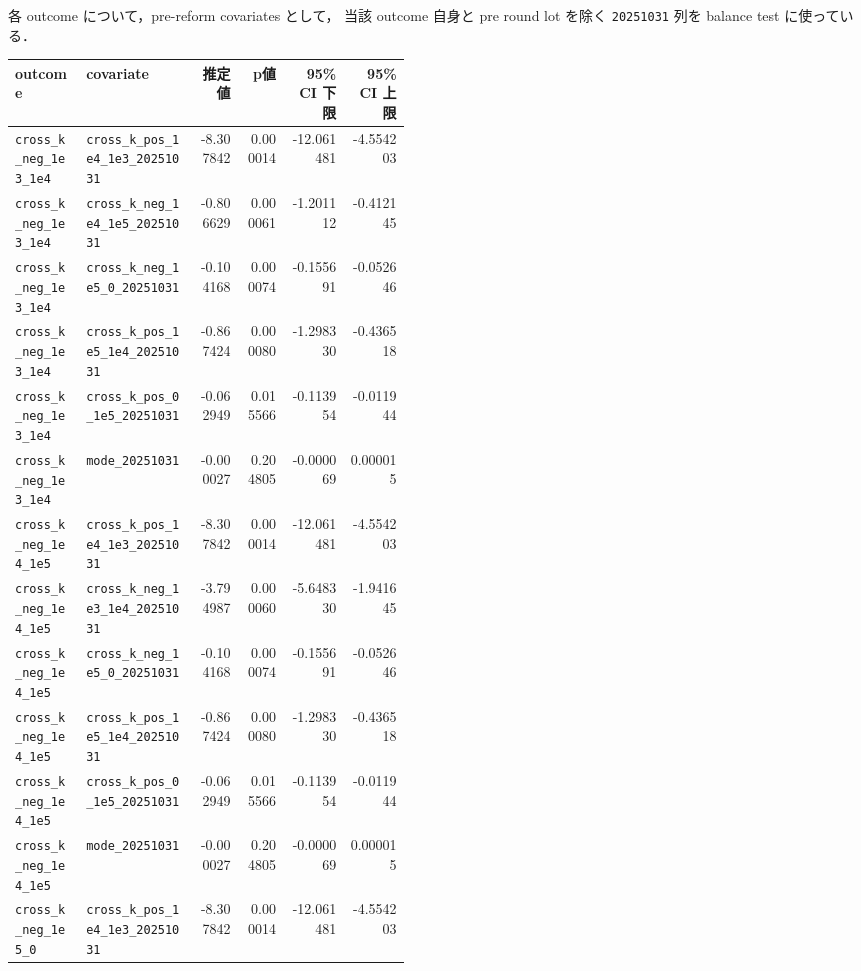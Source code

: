 \documentclass[a4paper,11pt]{jlreq}
\begin{document}
各 outcome について，pre-reform covariates として，
当該 outcome 自身と pre round lot を除く
\texttt{20251031} 列を balance test に使っている．

\small
\begin{longtable}{p{0.18\linewidth}p{0.28\linewidth}r r r r}
\toprule
outcome & covariate & 推定値 & p値 & 95\% CI 下限 & 95\% CI 上限 \\
\midrule
\endhead
\texttt{cross\_k\_neg\_1e3\_1e4} & \texttt{cross\_k\_pos\_1e4\_1e3\_20251031} & -8.307842 & 0.000014 & -12.061481 & -4.554203 \\
\texttt{cross\_k\_neg\_1e3\_1e4} & \texttt{cross\_k\_neg\_1e4\_1e5\_20251031} & -0.806629 & 0.000061 & -1.201112 & -0.412145 \\
\texttt{cross\_k\_neg\_1e3\_1e4} & \texttt{cross\_k\_neg\_1e5\_0\_20251031}   & -0.104168 & 0.000074 & -0.155691 & -0.052646 \\
\texttt{cross\_k\_neg\_1e3\_1e4} & \texttt{cross\_k\_pos\_1e5\_1e4\_20251031} & -0.867424 & 0.000080 & -1.298330 & -0.436518 \\
\texttt{cross\_k\_neg\_1e3\_1e4} & \texttt{cross\_k\_pos\_0\_1e5\_20251031}   & -0.062949 & 0.015566 & -0.113954 & -0.011944 \\
\texttt{cross\_k\_neg\_1e3\_1e4} & \texttt{mode\_20251031}                    & -0.000027 & 0.204805 & -0.000069 &  0.000015 \\
\texttt{cross\_k\_neg\_1e4\_1e5} & \texttt{cross\_k\_pos\_1e4\_1e3\_20251031} & -8.307842 & 0.000014 & -12.061481 & -4.554203 \\
\texttt{cross\_k\_neg\_1e4\_1e5} & \texttt{cross\_k\_neg\_1e3\_1e4\_20251031} & -3.794987 & 0.000060 & -5.648330 & -1.941645 \\
\texttt{cross\_k\_neg\_1e4\_1e5} & \texttt{cross\_k\_neg\_1e5\_0\_20251031}   & -0.104168 & 0.000074 & -0.155691 & -0.052646 \\
\texttt{cross\_k\_neg\_1e4\_1e5} & \texttt{cross\_k\_pos\_1e5\_1e4\_20251031} & -0.867424 & 0.000080 & -1.298330 & -0.436518 \\
\texttt{cross\_k\_neg\_1e4\_1e5} & \texttt{cross\_k\_pos\_0\_1e5\_20251031}   & -0.062949 & 0.015566 & -0.113954 & -0.011944 \\
\texttt{cross\_k\_neg\_1e4\_1e5} & \texttt{mode\_20251031}                    & -0.000027 & 0.204805 & -0.000069 &  0.000015 \\
\texttt{cross\_k\_neg\_1e5\_0}   & \texttt{cross\_k\_pos\_1e4\_1e3\_20251031} & -8.307842 & 0.000014 & -12.061481 & -4.554203 \\

\end{longtable}
\end{document}
